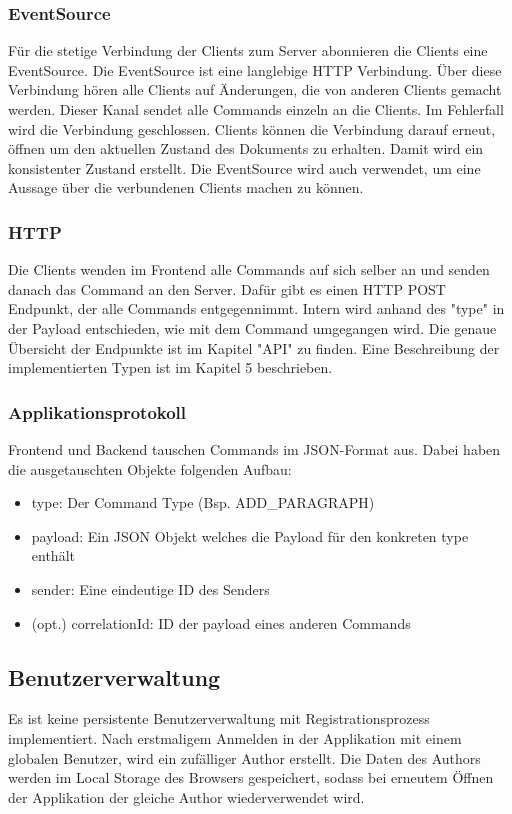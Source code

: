 \subsubsection{EventSource}
Für die stetige Verbindung der Clients zum Server abonnieren die Clients eine EventSource.
Die EventSource ist eine langlebige HTTP Verbindung.
Über diese Verbindung hören alle Clients auf Änderungen, die von anderen Clients gemacht werden.
Dieser Kanal sendet alle Commands einzeln an die Clients.
Im Fehlerfall wird die Verbindung geschlossen.
Clients können die Verbindung darauf erneut, öffnen um den aktuellen Zustand des Dokuments zu erhalten.
Damit wird ein konsistenter Zustand erstellt.
Die EventSource wird auch verwendet, um eine Aussage über die verbundenen Clients machen zu können.

\subsubsection{HTTP}
Die Clients wenden im Frontend alle Commands auf sich selber an und senden danach das Command an den Server.
Dafür gibt es einen HTTP POST Endpunkt, der alle Commands entgegennimmt.
Intern wird anhand des "type" in der Payload entschieden, wie mit dem Command umgegangen wird.
Die genaue Übersicht der Endpunkte ist im Kapitel "API" zu finden.
Eine Beschreibung der implementierten Typen ist im Kapitel 5 beschrieben.

\subsubsection{Applikationsprotokoll}

Frontend und Backend tauschen Commands im JSON-Format aus.
Dabei haben die ausgetauschten Objekte folgenden Aufbau:

\begin{itemize}
    \item type: Der Command Type (Bsp. ADD\_PARAGRAPH)
    \item payload: Ein JSON Objekt welches die Payload für den konkreten type enthält
    \item sender: Eine eindeutige ID des Senders
    \item (opt.) correlationId: ID der payload eines anderen Commands
\end{itemize}

\subsection{Benutzerverwaltung}
Es ist keine persistente Benutzerverwaltung mit Registrationsprozess implementiert.
Nach erstmaligem Anmelden in der Applikation mit einem globalen Benutzer, wird ein zufälliger Author erstellt.
Die Daten des Authors werden im Local Storage des Browsers gespeichert, sodass bei erneutem Öffnen der Applikation der gleiche Author wiederverwendet wird.
